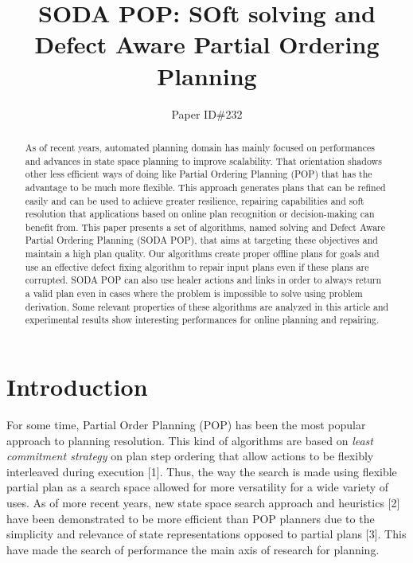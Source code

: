 \documentclass[]{article}
\title{SODA POP: SOft solving and Defect Aware Partial Ordering Planning}
\author{Paper ID\#232}
\date{}
\begin{document}
\maketitle
\begin{abstract}
As of recent years, automated planning domain has mainly focused on
performances and advances in state space planning to improve
scalability. That orientation shadows other less efficient ways of doing
like Partial Ordering Planning (POP) that has the advantage to be much
more flexible. This approach generates plans that can be refined easily
and can be used to achieve greater resilience, repairing capabilities
and soft resolution that applications based on online plan recognition
or decision-making can benefit from. This paper presents a set of
algorithms, named solving and Defect Aware Partial Ordering Planning
(SODA POP), that aims at targeting these objectives and maintain a high
plan quality. Our algorithms create proper offline plans for goals and
use an effective defect fixing algorithm to repair input plans even if
these plans are corrupted. SODA POP can also use healer actions and
links in order to always return a valid plan even in cases where the
problem is impossible to solve using problem derivation. Some relevant
properties of these algorithms are analyzed in this article and
experimental results show interesting performances for online planning
and repairing.
\end{abstract}

\section*{Introduction}\label{introduction}

For some time, Partial Order Planning (POP) has been the most popular
approach to planning resolution. This kind of algorithms are based on
\emph{least commitment strategy} on plan step ordering that allow
actions to be flexibly interleaved during execution {[}1{]}. Thus, the
way the search is made using flexible partial plan as a search space
allowed for more versatility for a wide variety of uses. As of more
recent years, new state space search approach and heuristics {[}2{]}
have been demonstrated to be more efficient than POP planners due to the
simplicity and relevance of state representations opposed to partial
plans {[}3{]}. This have made the search of performance the main axis of
research for planning.
\end{document}
